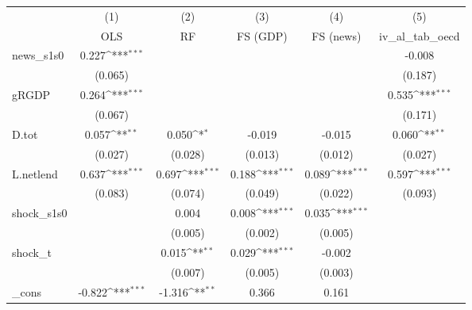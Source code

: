 {
\def\sym#1{\ifmmode^{#1}\else\(^{#1}\)\fi}
\begin{tabular}{l*{5}{c}}
\toprule
            &\multicolumn{1}{c}{(1)}&\multicolumn{1}{c}{(2)}&\multicolumn{1}{c}{(3)}&\multicolumn{1}{c}{(4)}&\multicolumn{1}{c}{(5)}\\
            &\multicolumn{1}{c}{OLS}&\multicolumn{1}{c}{RF}&\multicolumn{1}{c}{FS (GDP)}&\multicolumn{1}{c}{FS (news)}&\multicolumn{1}{c}{iv\_al\_tab\_oecd}\\
\midrule
news\_s1s0   &       0.227\sym{***}&                     &                     &                     &      -0.008         \\
            &     (0.065)         &                     &                     &                     &     (0.187)         \\
\addlinespace
gRGDP       &       0.264\sym{***}&                     &                     &                     &       0.535\sym{***}\\
            &     (0.067)         &                     &                     &                     &     (0.171)         \\
\addlinespace
D.tot       &       0.057\sym{**} &       0.050\sym{*}  &      -0.019         &      -0.015         &       0.060\sym{**} \\
            &     (0.027)         &     (0.028)         &     (0.013)         &     (0.012)         &     (0.027)         \\
\addlinespace
L.netlend   &       0.637\sym{***}&       0.697\sym{***}&       0.188\sym{***}&       0.089\sym{***}&       0.597\sym{***}\\
            &     (0.083)         &     (0.074)         &     (0.049)         &     (0.022)         &     (0.093)         \\
\addlinespace
shock\_s1s0  &                     &       0.004         &       0.008\sym{***}&       0.035\sym{***}&                     \\
            &                     &     (0.005)         &     (0.002)         &     (0.005)         &                     \\
\addlinespace
shock\_t     &                     &       0.015\sym{**} &       0.029\sym{***}&      -0.002         &                     \\
            &                     &     (0.007)         &     (0.005)         &     (0.003)         &                     \\
\addlinespace
\_cons      &      -0.822\sym{***}&      -1.316\sym{**} &       0.366         &       0.161         &                     \\

\end{tabular}}
